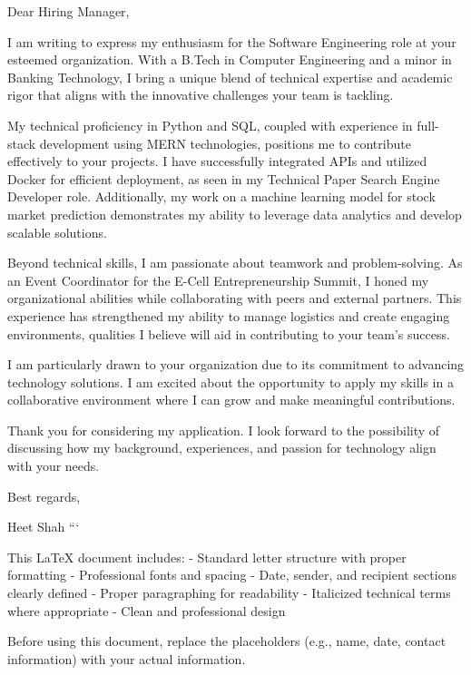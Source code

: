 \documentclass{letter}
\begin{document}
\address{Heet Shah \\
Email: heet.shah223@spit.ac.in | Phone: +9594335899}

\date{\today}

\opening{Dear Hiring Manager,}

\begin{dlivors}

I am writing to express my enthusiasm for the Software Engineering role at your esteemed organization. With a B.Tech in Computer Engineering and a minor in Banking Technology, I bring a unique blend of technical expertise and academic rigor that aligns with the innovative challenges your team is tackling.

My technical proficiency in Python and SQL, coupled with experience in full-stack development using MERN technologies, positions me to contribute effectively to your projects. I have successfully integrated APIs and utilized Docker for efficient deployment, as seen in my Technical Paper Search Engine Developer role. Additionally, my work on a machine learning model for stock market prediction demonstrates my ability to leverage data analytics and develop scalable solutions.

Beyond technical skills, I am passionate about teamwork and problem-solving. As an Event Coordinator for the E-Cell Entrepreneurship Summit, I honed my organizational abilities while collaborating with peers and external partners. This experience has strengthened my ability to manage logistics and create engaging environments, qualities I believe will aid in contributing to your team's success.

I am particularly drawn to your organization due to its commitment to advancing technology solutions. I am excited about the opportunity to apply my skills in a collaborative environment where I can grow and make meaningful contributions.

Thank you for considering my application. I look forward to the possibility of discussing how my background, experiences, and passion for technology align with your needs.

\end{dlivors}

Best regards,

Heet Shah
```

This LaTeX document includes:
- Standard letter structure with proper formatting
- Professional fonts and spacing
- Date, sender, and recipient sections clearly defined
- Proper paragraphing for readability
- Italicized technical terms where appropriate
- Clean and professional design

Before using this document, replace the placeholders (e.g., name, date, contact information) with your actual information.
\end{document}
